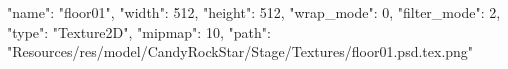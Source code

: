 {
  "name": "floor01",
  "width": 512,
  "height": 512,
  "wrap_mode": 0,
  "filter_mode": 2,
  "type": "Texture2D",
  "mipmap": 10,
  "path": "Resources/res/model/CandyRockStar/Stage/Textures/floor01.psd.tex.png"
}